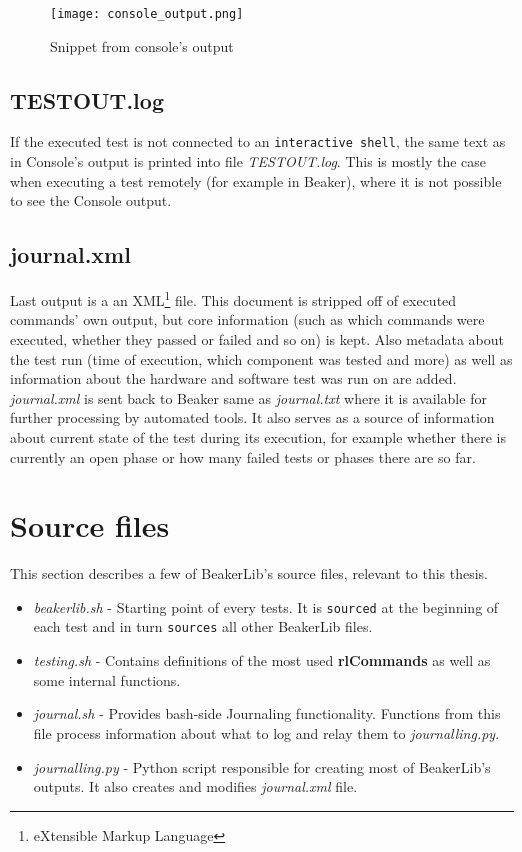 \begin{figure}
  \texttt{[image: console\_output.png]}
  \caption{Snippet from console's output}
  \label{fig:console_output}
\end{figure}

\subsection{TESTOUT.log}
If the executed test is not connected to an \texttt{interactive shell}, the same text as in Console's output is printed into file \textit{TESTOUT.log}. This is mostly the case when executing a test remotely (for example in Beaker), where it is not possible to see the Console output.

\subsection{journal.xml}
Last output is a an XML\footnote{eXtensible Markup Language} file. This document is stripped off of executed commands' own output, but core information (such as which commands were executed, whether they passed or failed and so on) is kept. Also metadata about the test run (time of execution, which component was tested and more) as well as information about the hardware and software test was run on are added. \textit{journal.xml} is sent back to Beaker same as \textit{journal.txt} where it is available for further processing by automated tools. It also serves as a source of information about current state of the test during its execution, for example whether there is currently an open phase or how many failed tests or phases there are so far.

\section{Source files}
This section describes a few of BeakerLib's source files, relevant to this thesis.
\begin{itemize}
\item \textit{beakerlib.sh} - Starting point of every tests. It is \texttt{sourced} at the beginning of each test and in turn \texttt{sources} all other BeakerLib files.
\item \textit{testing.sh} - Contains definitions of the most used \textbf{rlCommands} as well as some internal functions.
\item \textit{journal.sh} - Provides bash-side Journaling functionality. Functions from this file process information about what to log and relay them to \textit{journalling.py}.
\item \textit{journalling.py} - Python script responsible for creating most of BeakerLib's outputs. It also creates and modifies \textit{journal.xml} file.
\end{itemize}

